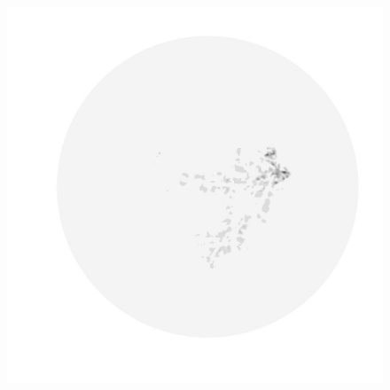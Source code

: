 \begin{figure}
\begin{minipage}[b]{0.30\linewidth}
  \end{minipage}
  \quad
  \begin{minipage}[b]{0.30\linewidth}
    \includegraphics[width=1.0\textwidth]{images/EISMINT_II/Ubar/U_mag_500.jpg}
  \end{minipage}
  

\end{figure}
